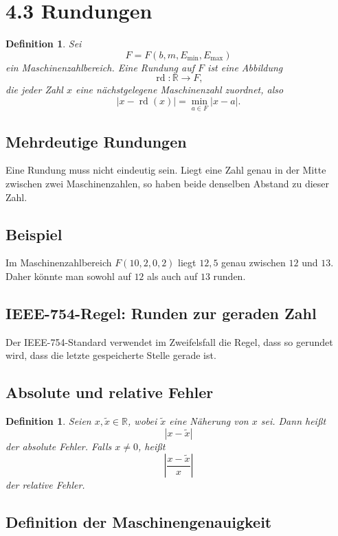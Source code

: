 \documentclass{article}
\newcommand{\R}{\mathbb{R}}
\newtheorem{defn}[thm]{Definition}
\begin{document}
\section{4.3 Rundungen}

\begin{defn}
Sei
\[
F=F(b,m,E_{\min},E_{\max})
\]
ein Maschinenzahlbereich. Eine Rundung auf \(F\) ist eine Abbildung
\[
\operatorname{rd}:\R\to F,
\]
die jeder Zahl \(x\) eine nächstgelegene Maschinenzahl zuordnet, also
\[
|x-\operatorname{rd}(x)|
=
\min_{a\in F}|x-a|.
\]
\end{defn}

\subsection*{Mehrdeutige Rundungen}

Eine Rundung muss nicht eindeutig sein. Liegt eine Zahl genau in der Mitte zwischen zwei Maschinenzahlen, so haben beide denselben Abstand zu dieser Zahl.

\subsection*{Beispiel}

Im Maschinenzahlbereich \(F(10,2,0,2)\) liegt \(12{,}5\) genau zwischen \(12\) und \(13\). Daher könnte man sowohl auf \(12\) als auch auf \(13\) runden.

\subsection*{IEEE-754-Regel: Runden zur geraden Zahl}

Der IEEE-754-Standard verwendet im Zweifelsfall die Regel, dass so gerundet wird, dass die letzte gespeicherte Stelle gerade ist.

\subsection*{Absolute und relative Fehler}

\begin{defn}
Seien \(x,\tilde{x}\in\R\), wobei \(\tilde{x}\) eine Näherung von \(x\) sei. Dann heißt
\[
|x-\tilde{x}|
\]
der \emph{absolute Fehler}. Falls \(x\neq 0\), heißt
\[
\left|\frac{x-\tilde{x}}{x}\right|
\]
der \emph{relative Fehler}.
\end{defn}

\subsection*{Definition der Maschinengenauigkeit}
\end{document}

